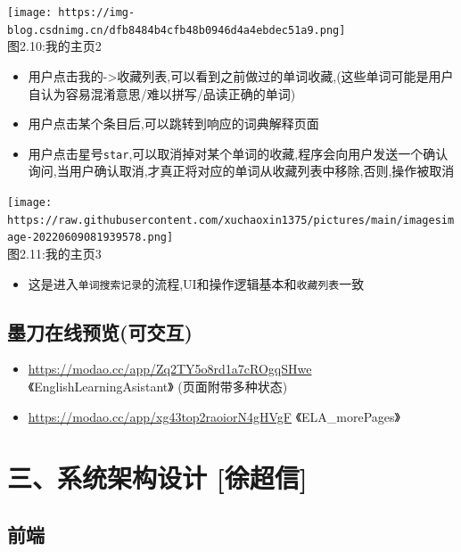 \documentclass[
]{article}
\begin{document}
\texttt{[image: https://img-blog.csdnimg.cn/dfb8484b4cfb48b0946d4a4ebdec51a9.png]}\\
图2.10:我的主页2

\begin{itemize}
\item
  用户点击我的-\textgreater 收藏列表,可以看到之前做过的单词收藏,(这些单词可能是用户自认为容易混淆意思/难以拼写/品读正确的单词)
\item
  用户点击某个条目后,可以跳转到响应的词典解释页面
\item
  用户点击星号\texttt{star},可以取消掉对某个单词的收藏,程序会向用户发送一个确认询问,当用户确认取消,才真正将对应的单词从收藏列表中移除,否则,操作被取消
\end{itemize}

\texttt{[image: https://raw.githubusercontent.com/xuchaoxin1375/pictures/main/imagesimage-20220609081939578.png]}\\
图2.11:我的主页3

\begin{itemize}
\item
  这是进入\texttt{单词搜索记录}的流程,UI和操作逻辑基本和\texttt{收藏列表}一致
\end{itemize}

\hypertarget{ux58a8ux5200ux5728ux7ebfux9884ux89c8ux53efux4ea4ux4e92}{%
\subsection{墨刀在线预览(可交互)}\label{ux58a8ux5200ux5728ux7ebfux9884ux89c8ux53efux4ea4ux4e92}}

\begin{itemize}
\item
  \url{https://modao.cc/app/Zq2TY5o8rd1a7cROgqSHwe}
  《EnglishLearningAsistant》 (页面附带多种状态)
\item
  \url{https://modao.cc/app/xg43top2raoiorN4gHVgF} 《ELA\_morePages》
\end{itemize}

\hypertarget{ux4e09ux7cfbux7edfux67b6ux6784ux8bbeux8ba1-ux5f90ux8d85ux4fe1}{%
\section{三、系统架构设计
{[}徐超信{]}}\label{ux4e09ux7cfbux7edfux67b6ux6784ux8bbeux8ba1-ux5f90ux8d85ux4fe1}}

\hypertarget{ux524dux7aef}{%
\subsection{前端}\label{ux524dux7aef}}
\end{document}
